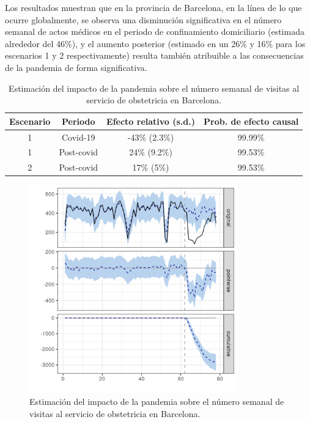 \documentclass[12pt,twoside]{article} %
\begin{document}
Los resultados muestran que en la provincia de Barcelona, en la línea de lo que ocurre globalmente, se observa una disminución significativa en el número semanal de actos médicos en el periodo de confinamiento domiciliario (estimada alrededor del 46\%), y el aumento posterior (estimado en un 26\% y 16\% para los escenarios 1 y 2 respectivamente) resulta también atribuible a las consecuencias de la pandemia de forma significativa.

\begin{table}[H]\caption{Estimación del impacto de la pandemia sobre el número semanal de visitas al servicio de obstetricia en Barcelona.}
    \centering  
    \begin{tabular}{ |c|c|c|c| }
        \hline
        \textbf{Escenario} & \textbf{Periodo} & \textbf{Efecto relativo (s.d.)} & \textbf{Prob. de efecto causal} \\ 
        \hline
     1 & Covid-19 & -43\% (2.3\%) & 99.99\% \\  
     1 & Post-covid & 24\% (9.2\%) & 99.53\% \\
     \hline   
     2 & Post-covid & 17\% (5\%) & 99.53\% \\
     \hline
    \end{tabular}
  \end{table}
  
  \begin{center}
    \begin{figure}[H]
      \includegraphics[width=9cm]{obstetrics_covid_Barcelona.png}\caption{Estimación del impacto de la pandemia sobre el número semanal de visitas al servicio de obstetricia en Barcelona.}
    \end{figure}
    \end{center}
    
\end{document}
